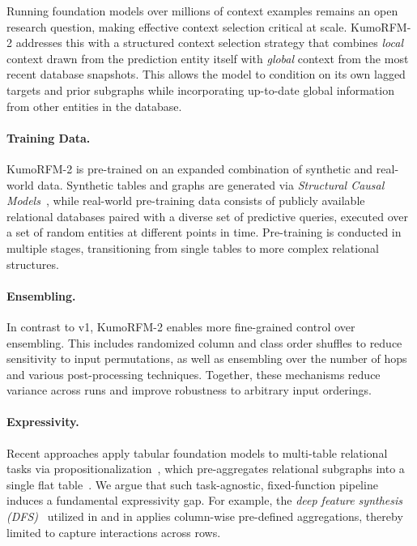 \documentclass{article}
\newcommand{\onezero}{1\xspace}
\newcommand{\twozero}{2\xspace}
\newcommand{\name}{KumoRFM\xspace}
\newcommand{\nametwo}{\name-\twozero}
\begin{document}
Running foundation models over millions of context examples remains an open research question, making effective context selection critical at scale.
\nametwo addresses this with a structured context selection strategy that combines \emph{local} context drawn from the prediction entity itself with \emph{global} context from the most recent database snapshots.
This allows the model to condition on its own lagged targets and prior subgraphs while incorporating up-to-date global information from other entities in the database.

\paragraph{Training Data.}
\nametwo{} is pre-trained on an expanded combination of synthetic and real-world data. 
Synthetic tables and graphs are generated via \emph{Structural Causal Models}~\citep{pearl2009causality, peters2017elements,tabpfn,hoppe2025generating,plurel},
while real-world pre-training data consists of publicly available relational databases paired with a diverse set of predictive queries, executed over a set of random entities at different points in time.
Pre-training is conducted in multiple stages, transitioning from single tables to more complex relational structures.

\paragraph{Ensembling.}

In contrast to v\onezero, \nametwo enables more fine-grained control over ensembling. This includes randomized column and class order shuffles to reduce sensitivity to input permutations, as well as ensembling over the number of hops and various post-processing techniques.
Together, these mechanisms reduce variance across runs and improve robustness to arbitrary input orderings.

\paragraph{Expressivity.}
\label{sec:counterexample}

Recent approaches apply tabular foundation models to multi-table relational tasks via propositionalization~\citep{kramer2001propositionalization,kanter2015deep}, which pre-aggregates relational subgraphs into a single flat table~\citep{hayler2025bringing,eremeev2025turning,
xu2026rdblearn, wang2026reliclsynthetic,gnntabpfn}.
We argue that such task-agnostic, fixed-function pipeline induces a fundamental expressivity gap.
For example, the \emph{deep feature synthesis (DFS)}~\citep{kanter2015deep} utilized in \citet{xu2026rdblearn} and in \citet{wang2026reliclsynthetic} applies column-wise pre-defined aggregations, thereby limited to capture interactions across rows.
\end{document}
